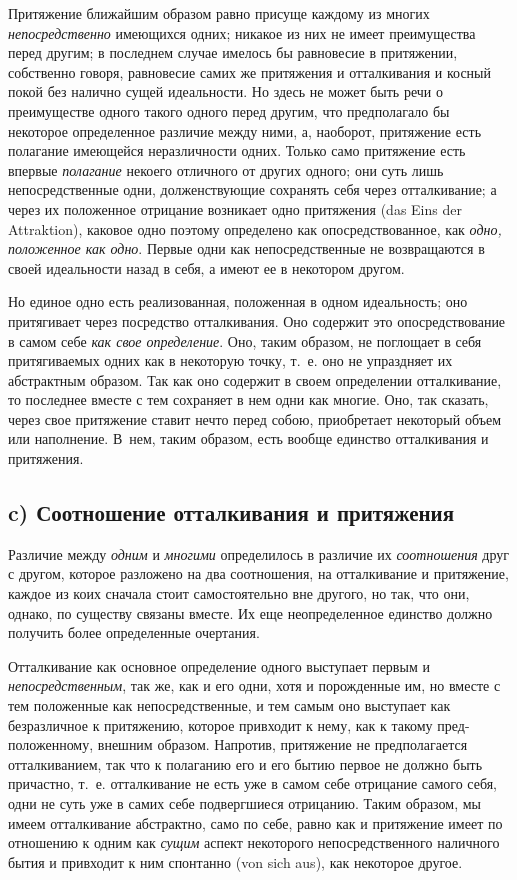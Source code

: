 Притяжение ближайшим образом равно присуще каждому из многих
{\em непосредственно} имеющихся одних; никакое из них
не имеет преимущества перед другим; в последнем случае имелось бы
равновесие в притяжении, собственно говоря, равновесие самих же притяжения
и отталкивания и косный покой без налично сущей идеальности. Но здесь не
может быть речи о преимуществе одного такого одного перед другим, что
предполагало бы некоторое определенное различие между ними, а, наоборот,
притяжение есть полагание имеющейся неразличности одних. Только само
притяжение есть впервые {\em полагание} некоего
отличного от других одного; они суть лишь непосредственные одни,
долженствующие сохранять себя через отталкивание; а через их положенное
отрицание возникает одно притяжения (das Eins der Attraktion), каковое одно
поэтому определено как опосредствованное, как
{\em одно, положенное как одно}. Первые одни как
непосредственные не возвращаются в своей идеальности назад в себя, а имеют
ее в некотором другом.

Но единое одно есть реализованная, положенная в одном идеальность; оно
притягивает через посредство отталкивания. Оно содержит это
опосредствование в самом себе {\em как свое
определение}. Оно, таким образом, не поглощает в себя притягиваемых одних
как в некоторую точку, т.~е. оно не упраздняет их абстрактным образом. Так
как оно содержит в своем определении отталкивание, то последнее вместе с
тем сохраняет в нем одни как многие. Оно, так сказать, через свое
притяжение ставит нечто перед собою, приобретает некоторый объем или
наполнение. В~нем, таким образом, есть вообще единство отталкивания и
притяжения.

\subsection[c) Соотношение отталкивания и притяжения]{c) Соотношение отталкивания и притяжения}
Различие между {\em одним} и {\em многими} определилось в различие их
{\em соотношения} друг с другом, которое разложено на два соотношения, на
отталкивание и притяжение, каждое из коих сначала стоит самостоятельно вне
другого, но так, что они, однако, по существу связаны вместе. Их еще
неопределенное единство должно получить более определенные очертания.

Отталкивание как основное определение одного выступает первым и
{\em непосредственным}, так же, как и его одни, хотя и
порожденные им, но вместе с тем положенные как непосредственные, и тем
самым оно выступает как безразличное к притяжению, которое привходит к
нему, как к такому пред-положенному, внешним образом. Напротив, притяжение
не предполагается отталкиванием, так что к полаганию его и его бытию первое
не должно быть причастно, т.~е. отталкивание не есть уже в самом себе
отрицание самого себя, одни не суть уже в самих себе подвергшиеся
отрицанию. Таким образом, мы имеем отталкивание абстрактно, само по себе,
равно как и притяжение имеет по отношению к одним как
{\em сущим} аспект некоторого непосредственного наличного бытия и
привходит к ним спонтанно (von sich aus), как некоторое другое.

